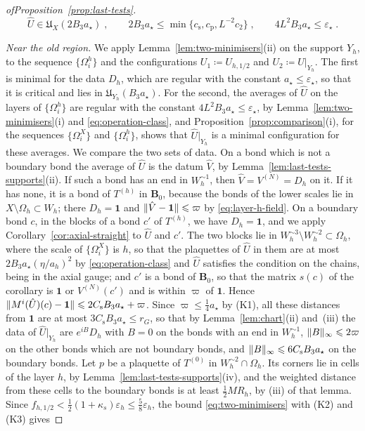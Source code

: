 \documentclass[11pt]{preprint}
\newcommand{\id}{\mathbf 1}
\DeclarePairedDelimiter{\norm}{\lVert}{\rVert}
\numberwithin{equation}{section}
\begin{document}
\begin{proof}[ofProposition~\ref{prop:last-tests}]
\begin{equation}\label{eq:operation-class}
    \hat U \in \mathfrak U_X(2B_3a_\star)\;,
    \qquad
    2B_3a_\star \leqslant \min\bigl\{ c_{\mathrm s}, c_{\mathrm p}, L^{-2}c_2 \bigr\}\;,
    \qquad
    4L^2B_3a_\star \leqslant \varepsilon_\star\;.
\end{equation}

\emph{Near the old region.} We apply Lemma~\ref{lem:two-minimisers}(ii) on the support $Y_h$, to the sequence $\{ \Omega^h_i \}$ and the configurations $U_1 \coloneqq U_{h,1/2}$ and $U_2 \coloneqq \hat U|_{Y_h}$. The first is minimal for the data $D_h$, which are regular with the constant $a_\star \leqslant \varepsilon_\star$, so that it is critical and lies in $\mathfrak U_{Y_h}(B_3a_\star)$. For the second, the averages of $\hat U$ on the layers of $\{ \Omega^h_i \}$ are regular with the constant $4L^2B_3a_\star \leqslant \varepsilon_\star$, by Lemma~\ref{lem:two-minimisers}(i) and \eqref{eq:operation-class}, and Proposition~\ref{prop:comparison}(i), for the sequences $\{ \Omega^X_i \}$ and $\{ \Omega^h_i \}$, shows that $\hat U|_{Y_h}$ is a minimal configuration for these averages. We compare the two sets of data. On a bond which is not a boundary bond the average of $\hat U$ is the datum $\hat V$, by Lemma~\ref{lem:last-tests-supports}(ii). If such a bond has an end in $W_h^{\sim1}$, then $\hat V = V^{(N)} = D_h$ on it. If it has none, it is a bond of $T^{(h)}$ in $\mathbf B_0$, because the bonds of the lower scales lie in $X \setminus \Omega_h \subset W_h$; there $D_h = \id$ and $\norm{\hat V - \id} \leqslant \varpi$ by \eqref{eq:layer-h-field}. On a boundary bond $c$, in the blocks of a bond $c'$ of $T^{(h)}$, we have $D_h = \id$, and we apply Corollary~\ref{cor:axial-straight} to $\hat U$ and $c'$. The two blocks lie in $W_h^{\sim3} \setminus W_h^{\sim2} \subset \Omega_h$, where the scale of $\{ \Omega^X_i \}$ is $h$, so that the plaquettes of $\hat U$ in them are at most $2B_3a_\star(\eta/a_h)^2$ by \eqref{eq:operation-class} and $\hat U$ satisfies the condition on the chains, being in the axial gauge; and $c'$ is a bond of $\mathbf B_0$, so that the matrix $s(c)$ of the corollary is $\id$ or $V^{(N)}(c')$ and is within $\varpi$ of $\id$. Hence $\norm{M^i(\hat U)(c) - \id} \leqslant 2C_{\mathrm s}B_3a_\star + \varpi$. Since $\varpi \leqslant \frac{1}{4}a_\star$ by (K1), all these distances from $\id$ are at most $3C_{\mathrm s}B_3a_\star \leqslant r_G$, so that by Lemma~\ref{lem:chart}(ii) and~(iii) the data of $\hat U|_{Y_h}$ are $e^{iB}D_h$ with $B = 0$ on the bonds with an end in $W_h^{\sim1}$, $\norm B_\infty \leqslant 2\varpi$ on the other bonds which are not boundary bonds, and $\norm B_\infty \leqslant 6C_{\mathrm s}B_3a_\star$ on the boundary bonds. Let $p$ be a plaquette of $T^{(0)}$ in $W_h^{\sim2} \cap \Omega_h$. Its corners lie in cells of the layer $h$, by Lemma~\ref{lem:last-tests-supports}(iv), and the weighted distance from these cells to the boundary bonds is at least $\frac{1}{2}MR_h$, by (iii) of that lemma. Since $f_{h,1/2} < \frac{1}{2}(1 + \kappa_s)\varepsilon_h \leqslant \frac{5}{8}\varepsilon_h$, the bound \eqref{eq:two-minimisers} with (K2) and (K3) gives

\end{proof}
\end{document}
